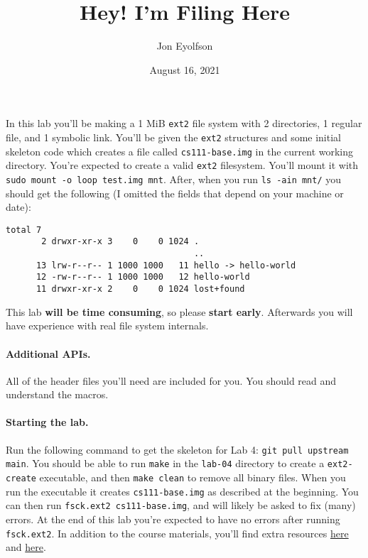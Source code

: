 

\title{Hey! I'm Filing Here}
\author{Jon Eyolfson}
\date{August 16, 2021}



\maketitle

In this lab you'll be making a 1 MiB \texttt{ext2} file system with 2
directories, 1 regular file, and 1 symbolic link.
You'll be given the \texttt{ext2} structures and some initial skeleton code
which creates a file called \texttt{cs111-base.img} in the current working
directory.
You're expected to create a valid \texttt{ext2} filesystem.
You'll mount it with \texttt{sudo mount -o loop test.img mnt}.
After, when you run \texttt{ls -ain mnt/} you should get the following
(I omitted the fields that depend on your machine or date):

\begin{lstlisting}
total 7
       2 drwxr-xr-x 3    0    0 1024 .
                                     ..
      13 lrw-r--r-- 1 1000 1000   11 hello -> hello-world
      12 -rw-r--r-- 1 1000 1000   12 hello-world
      11 drwxr-xr-x 2    0    0 1024 lost+found
\end{lstlisting}

This lab \textbf{will be time consuming}, so please \textbf{start early}.
Afterwards you will have experience with real file system internals.

\paragraph{Additional APIs.}

All of the header files you'll need are included for you.
You should read and understand the macros.

\paragraph{Starting the lab.}

Run the following command to get the skeleton for Lab 4:
\texttt{git pull upstream main}.
You should be able to run \texttt{make} in the \texttt{lab-04} directory to
create a \texttt{ext2-create} executable, and then \texttt{make clean}
to remove all binary files.
When you run the executable it creates \texttt{cs111-base.img} as described
at the beginning.
You can then run \lstinline|fsck.ext2 cs111-base.img|, and will likely be
asked to fix (many) errors.
At the end of this lab you're expected to have no errors after running
\lstinline|fsck.ext2|.
In addition to the course materials, you'll find extra resources
\href{http://www.nongnu.org/ext2-doc/ext2.html}{here} and
\href{http://www.science.smith.edu/~nhowe/262/oldlabs/ext2.html}{here}.

